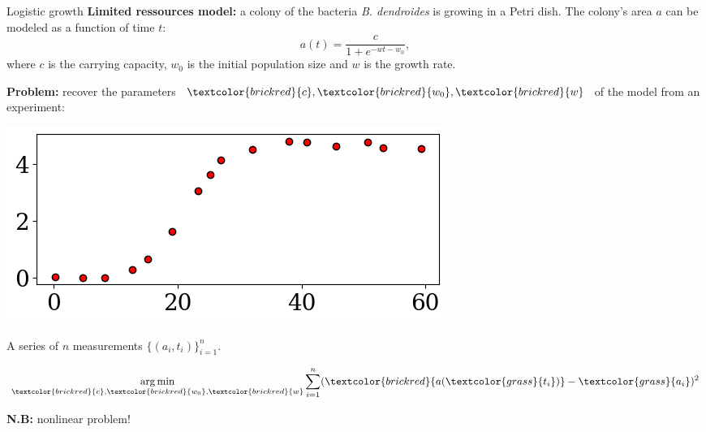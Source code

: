 \documentclass[UKenglish,aspectratio=169]{beamer}
\DeclareMathOperator*{\argmin}{arg\,min}
\newcommand\unknown[1]{\textcolor{brickred}{#1}}
\newcommand\known[1]{\textcolor{grass}{#1}}
\begin{document}
\begin{frame}{Logistic growth}
\textbf{Limited ressources model:} a colony of the bacteria \textit{B. dendroides} is growing in a Petri dish.
The colony's area $a$ can be modeled as a function of time $t$:
$$a(t) = \frac{c}{1+e^{-wt - w_0}},$$
where $c$ is the carrying capacity, $w_0$ is the initial population size and $w$ is the growth rate.

\pause
\vspace{1ex}
\textbf{Problem:} recover the parameters $\unknown{c},\unknown{w_0},\unknown{w}$ of the model from an experiment:
\begin{minipage}{.45\linewidth}
\centerline{\includegraphics[width=\linewidth]{../manuscript/img/example_8_1_a.png}}
\end{minipage}
\begin{minipage}{.45\linewidth}
A series of $n$ measurements $\{(a_i, t_i)\}_{i=1}^n$.

\pause
$$
\argmin\limits_{\unknown{c},\unknown{w_0},\unknown{w}} \sum\limits_{i=1}^n (\unknown{a(\known{t_i})} - \known{a_i})^2
$$

\qquad\textbf{N.B:} nonlinear problem!
\end{minipage}
\end{frame}
\end{document}
